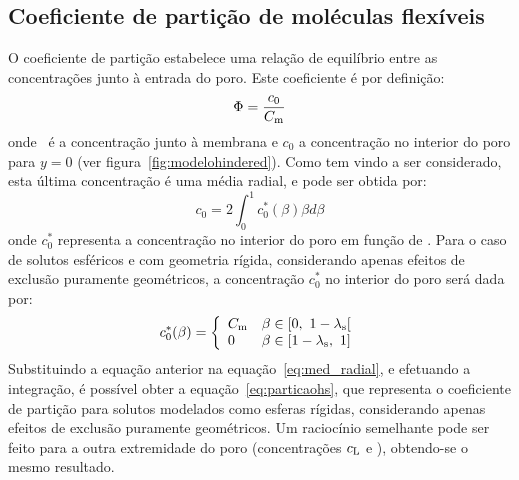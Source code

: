 \subsection{Coeficiente de partição de moléculas flexíveis}
\label{subsec:fiflex}
O coeficiente de partição estabelece uma relação de equilíbrio entre as concentrações junto à entrada do poro. Este coeficiente é por definição:
%
\begin{equation}
	\label{eq:parti1}
	\Phi = \frac{c_0}{C_{\mathrm{m}}}
\end{equation}
%
onde \concm\ é a concentração junto à membrana e $c_0$ a concentração no interior do poro para $y=0$ (ver figura~\ref{fig:modelohindered}). Como tem vindo a ser considerado, esta última concentração é uma média radial, e pode ser obtida por:
%
\begin{equation}
\label{eq:med_radial}
c_0 = 2\int_0^{1}c_0^{\ast}(\beta)\beta d\beta
\end{equation}%
%
onde $c_0^{\ast}$ representa a concentração no interior do poro em função de \radialadimensional. 
%
Para o caso de solutos esféricos e com geometria rígida, considerando apenas efeitos de exclusão puramente geométricos, a concentração $c_0^{\ast}$ no interior do poro será dada por:
\begin{equation}
	\label{eq:cast}
c_0^{\ast}(\beta)=\left\{\begin{array}{ll}%
		    \concm & \mbox{$\beta \in [0,\ 1-\lambdas[$} \\
             0 & \mbox{$\beta \in [1-\lambdas,\ 1]$} \\
                       \end{array}    	
			          \right.
\end{equation}%
Substituindo a equação anterior na equação~\ref{eq:med_radial}, e efetuando a integração, é possível obter a equação~\ref{eq:particaohs}, que representa o coeficiente de partição para solutos modelados como esferas rígidas, considerando apenas efeitos de exclusão puramente geométricos. 
%
Um raciocínio semelhante pode ser feito para a outra extremidade do poro (concentrações $c_{\mathrm{L}}$ e \concp), obtendo-se o mesmo resultado.

